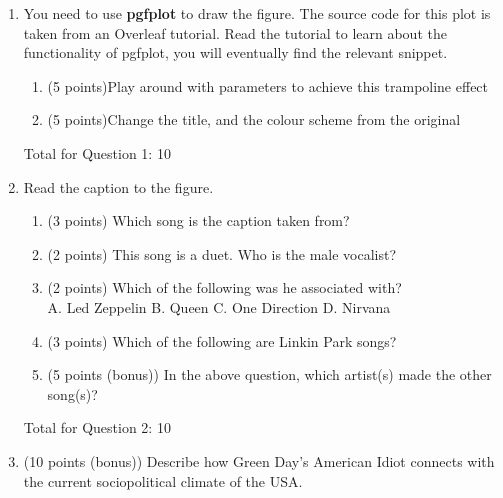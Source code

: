 \documentclass{article}
\begin{document}
\begin{flushleft}

\begin{enumerate}
\item You need to use \textbf{pgfplot} to draw the figure. The source code for this plot is taken from an Overleaf
tutorial. Read the tutorial to learn about the functionality of pgfplot, you will eventually find the
relevant snippet.

\begin{enumerate}[label=(\alph*)]
\item(5 points)Play around with parameters to achieve this trampoline effect
\item(5 points)Change the title, and the colour scheme from the original
\end{enumerate}
\hfill{Total for Question 1: 10}

\item Read the caption to the figure.
\begin{enumerate}[label=(\alph*)]
\item(3 points) Which song is the caption taken from?
\item(2 points) This song is a duet. Who is the male vocalist?
\item (2 points) Which of the following was he associated with?\\
A. Led Zeppelin \hspace{0.5cm} B. Queen \hspace{0.5cm} C. One Direction \hspace{0.5cm} D. Nirvana
\item(3 points) Which of the following are Linkin Park songs?
\item(5 points (bonus)) In the above question, which artist(s) made the other song(s)?
\end{enumerate}
\hfill{Total for Question 2: 10}

\item(10 points (bonus)) Describe how Green Day’s American Idiot connects with the current sociopolitical
climate of the USA.




\end{enumerate}




\end{flushleft}
\end{document}
